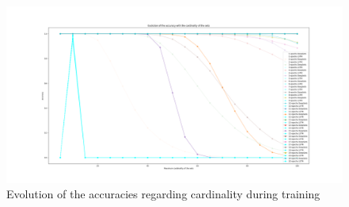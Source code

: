\documentclass[a4paper]{article}
\begin{document}
\begin{figure}[h]
    \centering
    \includegraphics[width=1.\textwidth]{figures/deep_set_performances_evol.png}
    \caption{Evolution of the accuracies regarding cardinality during training}
    \label{fig:performances_deepset_lstm_evolution}
\end{figure}


% 
% 
\end{document}
